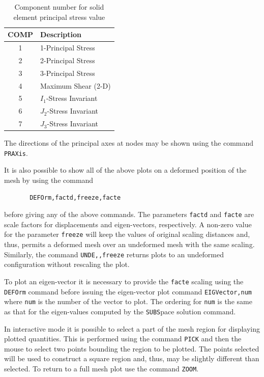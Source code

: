 \begin{table}
\begin{center}
\begin{tabular}{| c | l |} \hline
COMP & Description \\ \hline
1 & 1-Principal Stress \\
2 & 2-Principal Stress \\
3 & 3-Principal Stress \\
4 & Maximum Shear (2-D) \\
5 & $I_1$-Stress Invariant\\
6 & $J_2$-Stress Invariant\\
7 & $J_3$-Stress Invariant\\ \hline
\end{tabular}
\caption{Component number for solid element principal stress value}
\label{tab18b}
\end{center}
\end{table}
The directions of the principal axes at nodes may be shown using the
command {\tt PRAXis}.

It is also possible to show all of the above
plots on a deformed position of the mesh by using the command
\begin{verbatim}
       DEFOrm,factd,freeze,facte
\end{verbatim}
before giving any of the above commands.  The parameters {\tt factd} and
{\tt facte} are scale factors for displacements and eigen-vectors, respectively.
A non-zero value for the parameter {\tt freeze} will keep the values of
original scaling distances and, thus, permits a deformed mesh over an undeformed
mesh with the same scaling.  Similarly, the command {\tt UNDE,,freeze} returns
plots to an undeformed configuration without rescaling the plot.

To plot an eigen-vector it is necessary to provide the {\tt facte} scaling using
the {\tt DEFOrm} command before issuing the eigen-vector plot command
{\tt EIGVector,num} where {\tt num} is the number of the vector to plot.
The ordering for {\tt num} is the same as that for the eigen-values computed
by the {\tt SUBS}pace solution command.

In interactive mode it is possible to select a part of the mesh region for
displaying plotted quantities.  This is performed using the command {\tt PICK}
and then the mouse to select two points bounding the region to be plotted.  
The points selected will be used to construct a square region and, thus,
may be slightly different than selected.  To return to a full mesh plot
use the command {\tt ZOOM}.

